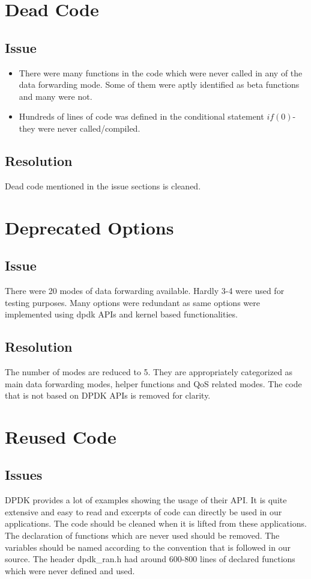 \section{Dead Code}
\subsection{Issue}
\begin{itemize}
	\item There were many functions in the code which were never called in any of the data forwarding mode.
	      Some of them were aptly identified as beta functions and many were not.
	\item Hundreds of lines of code was defined in the  conditional statement $if(0)$- they were never called/compiled.
\end{itemize}
\subsection{Resolution}
Dead code mentioned in the issue sections is cleaned.

\section{Deprecated Options}
\subsection{Issue}
There were 20 modes of data forwarding available. Hardly 3-4 were used for testing purposes. Many options 
were redundant as same options were implemented using dpdk APIs and kernel based functionalities.
\subsection{Resolution}
The number of modes are reduced to 5. They are appropriately categorized as main data forwarding modes, helper 
functions and QoS related modes. The code that is not based on DPDK APIs is removed for clarity.
\section{Reused Code}
\subsection{Issues}
DPDK provides a lot of examples showing the usage of their API. It is quite extensive and easy to read and excerpts of 
code can directly be used in our applications. The code should be cleaned when it is lifted from these applications.
The declaration of functions which are never used should be removed. The variables should be named according to
the convention that is followed in our source. The header dpdk\_ran.h had around 600-800 lines of declared functions
which were never defined and used.
